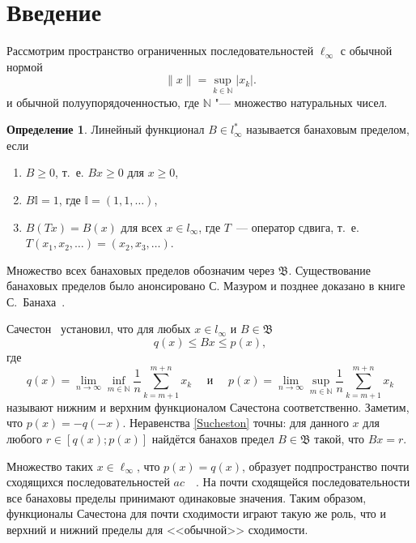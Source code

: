 \documentclass[a4paper,openbib]{article}
\renewcommand{\geq}{\geqslant} %
\theoremstyle{definition}
\newtheorem{definition}[lemma]{Определение}
\begin{document}
\section{Введение}

Рассмотрим пространство ограниченных последовательностей $\ell_\infty$ с обычной нормой
\begin{equation*}
	\|x\| = \sup_{k\in\mathbb{N}} |x_k|
	.
\end{equation*}
и обычной полуупорядоченностью, где $\mathbb{N}$ "--- множество натуральных чисел.


\begin{definition}
	Линейный функционал $B\in l_\infty^*$ называется банаховым пределом,
	если
	\begin{enumerate}
		\item
			$B\geq0$, т.~е. $Bx \geq 0$ для $x \geq 0$,
		\item
			$B\mathbb{I}=1$, где $\mathbb{I} =(1,1,\ldots)$,
		\item
			$B(Tx)=B(x)$ для всех $x\in l_\infty$, где $T$~---
		оператор сдвига, т.~е. $T(x_1,x_2,\ldots)=(x_2,x_3,\ldots)$.
	\end{enumerate}
\end{definition}
Множество всех банаховых пределов обозначим через $\mathfrak{B}$.
Существование банаховых пределов было анонсировано С. Мазуром \cite{Mazur} и позднее доказано в книге С.~Банаха~\cite{banach1993theorie}. 


Сачестон~\cite{sucheston1967banach} установил, что
для любых $x\in l_\infty$ и $B\in\mathfrak{B}$
\begin{equation}\label{Sucheston}
	q(x) \leqslant Bx \leqslant p(x)
	,
\end{equation}
где
\begin{equation*}
	q(x) = \lim_{n\to\infty} \inf_{m\in\mathbb{N}}  \frac{1}{n} \sum_{k=m+1}^{m+n} x_k
	\mbox{~~~~и~~~~}
	p(x) = \lim_{n\to\infty} \sup_{m\in\mathbb{N}}  \frac{1}{n} \sum_{k=m+1}^{m+n} x_k
\end{equation*}
называют нижним и верхним функционалом Сачестона соответственно.
Заметим, что $p(x) = -q(-x)$.
Неравенства \eqref{Sucheston} точны:
для данного $x$ для любого $r\in[q(x); p(x)]$ найдётся банахов предел
$B\in\mathfrak{B}$ такой, что $Bx = r$.

Множество таких $x\in\ell_\infty$, что $p(x)=q(x)$,
образует подпространство почти сходящихся последовательностей $ac$~~\cite{lorentz1948contribution}.
На почти сходящейся последовательности все банаховы пределы принимают одинаковые значения.
Таким образом, функционалы Сачестона для почти сходимости играют такую же роль,
что и верхний и нижний пределы для <<обычной>> сходимости.
\end{document}

